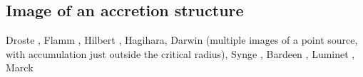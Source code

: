 \subsection{Image of an accretion structure}


\begin{hist}
Droste \cite{Drost1917}, Flamm \cite{Flamm1916}, Hilbert \cite{Hilbe1917a,Hilbe1917b}, Hagihara,  Darwin \cite{Darwi59} (multiple images of a point source, with accumulation just outside the critical radius), Synge \cite{Synge66}, Bardeen \cite{Barde73}, Luminet \cite{Lumin79,Lumin19}, Marck \cite{Marck96}

\end{hist}





